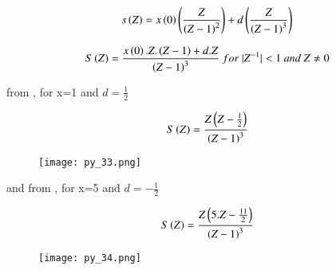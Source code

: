 \documentclass[beamer]{IEEEtran}
\theoremstyle{remark}
\begin{document}
$$s\left(Z\right)=x\left(0\right)\left(\frac{Z}{\left(Z-1\right)^2}\right)+d\left(\frac{Z}{\left(Z-1\right)^3}\right)$$

\begin{align}
\label{q23}
S\brak{Z}=\frac{x\brak{0}.Z.\brak{Z-1}+d.Z}{\brak{Z-1}^3}\ for\ |Z^{-1}|<1\ and\ Z\neq0
\end{align}

from \brak{\ref{q23}}, for x=1 and $d=\frac{1}{2}$

$$S\left(Z\right)=\frac{Z\left(Z-\frac{1}{2}\right)}{\left(Z-1\right)^3}$$

\begin{figure}[h]
    \centering
    \texttt{[image: py\_33.png]}
    \label{fig:enter-label}
\end{figure}

and from \brak{\ref{q23}}, for x=5 and $d=-\frac{1}{2}$

$$S\left(Z\right)=\frac{Z\left(5.Z-\frac{11}{2}\right)}{\left(Z-1\right)^3}$$

\begin{figure}[h]
    \centering
    \texttt{[image: py\_34.png]}
    \label{fig:enter-label}
\end{figure}
\end{document}
